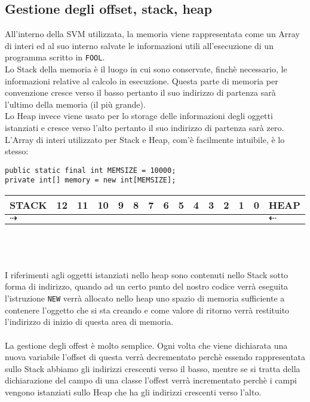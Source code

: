 \documentclass[a4paper]{article}   %
\begin{document}
\subsection{Gestione degli offset, stack, heap}
All'interno della SVM utilizzata, la memoria viene rappresentata come un Array di interi ed al suo interno salvate le informazioni utili all'esecuzione di un programma scritto in \lstinline|FOOL|.\\
Lo Stack della memoria è il luogo in cui sono conservate, finchè necessario, le informazioni relative al calcolo in esecuzione. Questa parte di memoria per convenzione cresce verso il basso
pertanto il suo indirizzo di partenza sarà l'ultimo della memoria (il più grande).\\
Lo Heap invece viene usato per lo storage delle informazioni degli oggetti istanziati e cresce verso l'alto pertanto il suo indirizzo di partenza sarà zero.\\
L'Array di interi utilizzato per Stack e Heap, com'è facilmente intuibile, è lo stesso:
\begin{lstlisting}[basicstyle=\footnotesize\ttfamily]
public static final int MEMSIZE = 10000;
private int[] memory = new int[MEMSIZE];
\end{lstlisting}
\begin{tabular}{ l | l | l | l | l | l | l | l | l | l | l | l | l | l | l     }
    \hline
    STACK & 12 & 11 & 10 & 9 & 8 & 7 & 6 & 5 & 4 & 3 & 2 & 1 & 0 & HEAP\\ \hline
    $\dashrightarrow$ &  &  &  &  &  &  &  &  &  &  &  &  & &  $\dashleftarrow$\\ \hline
  \end{tabular}
\\\\\\
I riferimenti agli oggetti istanziati nello heap sono contenuti nello Stack sotto forma di indirizzo, quando ad un certo punto del nostro codice verrà eseguita l'istruzione \lstinline|NEW| verrà allocato nello heap uno spazio di memoria sufficiente a contenere l'oggetto che si sta creando e come valore di ritorno verrà restituito l'indirizzo di inizio di questa area di memoria.
\\\\
La gestione degli offest è molto semplice. Ogni volta che viene dichiarata una nuova variabile l'offset di questa verrà decrementato perchè essendo rappresentata sullo Stack abbiamo gli indirizzi crescenti verso il basso, mentre se si tratta della dichiarazione del campo di una classe l'offest verrà incrementato perchè i campi vengono istanziati sullo Heap che ha gli indirizzi crescenti verso l'alto.
\end{document}
